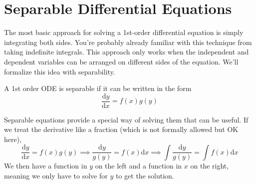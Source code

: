 \section{Separable Differential Equations}
\noindent
The most basic approach for solving a 1st-order differential equation is simply integrating both sides. You're probably already familiar with this technique from taking indefinite integrals. This approach only works when the independent and dependent variables can be arranged on different sides of the equation. We'll formalize this idea with separability.

\begin{definition}
	A 1st order ODE is separable if it can be written in the form
	\begin{equation*}
		\frac{\mathrm{d} y}{\mathrm{d} x} = f(x)g(y)
	\end{equation*}
\end{definition}

\noindent
Separable equations provide a special way of solving them that can be useful. If we treat the derivative like a fraction (which is not formally allowed but OK here),
\begin{equation*}
	\frac{\mathrm{d} y}{\mathrm{d} x} = f(x)g(y) \implies \frac{\mathrm{d} y}{g(y)} = f(x) \mathrm{d}x \implies \int{\frac{\mathrm{d} y}{g(y)}} = \int{f(x) \mathrm{d}x}
\end{equation*}
We then have a function in $y$ on the left and a function in $x$ on the right, meaning we only have to solve for $y$ to get the solution.

